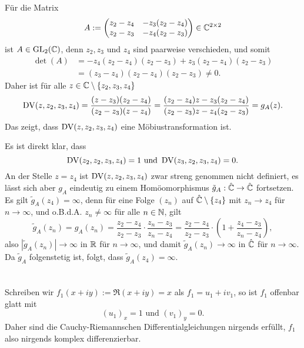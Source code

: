 \documentclass[a4paper,10pt]{article}
\begin{document}
\subsection{}
Für die Matrix
\[
 A := \begin{pmatrix}z_2-z_4 & -z_3(z_2-z_4) \\ z_2-z_3 & -z_4(z_2-z_3)\end{pmatrix} \in \mathbb{C}^{2 \times 2}
\]
ist $A \in \operatorname{GL}_2(\mathbb{C})$, denn $z_2, z_3$ und $z_4$ sind paarweise verschieden, und somit
\begin{align*}
 \det(A)
 &= -z_4(z_2-z_4)(z_2-z_3) + z_3(z_2-z_4)(z_2-z_3) \\
 &= (z_3-z_4)(z_2-z_4)(z_2-z_3)
 \neq 0.
\end{align*}
Daher ist für alle $z \in \mathbb{C} \setminus \{z_2, z_3, z_4\}$
\[
 \operatorname{DV}(z,z_2, z_3, z_4)
 = \frac{(z-z_3)(z_2-z_4)}{(z_2-z_3)(z-z_4)}
 = \frac{(z_2-z_4)z - z_3(z_2-z_4)}{(z_2-z_3)z-z_4(z_2-z_3)}
 = g_A(z).
\]
Das zeigt, dass $\operatorname{DV}(z,z_2,z_3,z_4)$ eine Möbiustransformation ist.

Es ist direkt klar, dass
\[
 \operatorname{DV}(z_2, z_2, z_3, z_4) = 1 \text{ und } \operatorname{DV}(z_3, z_2, z_3, z_4) = 0.
\]
An der Stelle $z = z_4$ ist $\operatorname{DV}(z,z_2,z_3,z_4)$ zwar streng genommen nicht definiert, es lässt sich aber $g_A$ eindeutig zu einem Homöomorphismus $\tilde{g}_A : \hat{\mathbb{C}} \to \hat{\mathbb{C}}$ fortsetzen. Es gilt $\tilde{g}_A(z_4) = \infty$, denn für eine Folge $(z_n)$ auf $\hat{\mathbb{C}} \setminus \{z_4\}$ mit $z_n \to z_4$ für $n \to \infty$, und o.B.d.A. $z_n \neq \infty$ für alle $n \in \mathbb{N}$, gilt
\[
 \tilde{g}_A(z_n) = g_A(z_n)
 = \frac{z_2 - z_4}{z_2 - z_3} \cdot \frac{z_n - z_3}{z_n -z_4}
 = \frac{z_2 - z_4}{z_2 - z_3} \cdot \left(1 + \frac{z_4 - z_3}{z_n -z_4} \right),
\]
also $|\tilde{g}_A(z_n)| \to \infty$ in $\mathbb{R}$ für $n \to \infty$, und damit $\tilde{g}_A(z_n) \to \infty$ in $\hat{\mathbb{C}}$ für $n \to \infty$. Da $\tilde{g}_A$ folgenstetig ist, folgt, dass $\tilde{g}_A(z_4) = \infty$.















\section{}
Schreiben wir $f_1(x+iy) := \Re(x+iy) = x$ als $f_1 = u_1+iv_1$, so ist $f_1$ offenbar glatt mit
\[
 (u_1)_x = 1 \text{ und } (v_1)_y = 0.
\]
Daher sind die Cauchy-Riemannschen Differentialgleichungen nirgends erfüllt, $f_1$ also nirgends komplex differenzierbar.
\end{document}
